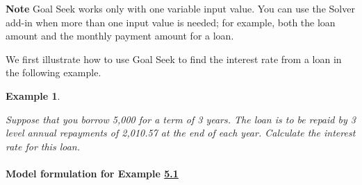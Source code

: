 \documentclass[
]{article}
\theoremstyle{definition}
\theoremstyle{definition}
\newtheorem{example}{Example}[section]
\theoremstyle{definition}
\theoremstyle{definition}
\theoremstyle{remark}
\begin{document}
\textbf{Note} Goal Seek works only with one variable input value. You can use the
Solver add-in when more than one input value is needed; for example,
both the loan amount and the monthly payment amount for a loan.

We first illustrate how to use Goal Seek to find the interest rate from
a loan in the following example.

\begin{example}
\protect\hypertarget{exm:exampleGoalSeek}{}\label{exm:exampleGoalSeek}

\emph{Suppose that you borrow 5,000 for a term of 3 years. The
loan is to be repaid by 3 level annual repayments of 2,010.57 at the end
of each year. Calculate the interest rate for this loan.}

\end{example}

\hypertarget{model-formulation-for-example-examplegoalseek}{%
\paragraph*{\texorpdfstring{Model formulation for Example \protect\hyperlink{exampleGoalSeek}{5.1}}{Model formulation for Example 5.1}}\label{model-formulation-for-example-examplegoalseek}}
\end{document}
